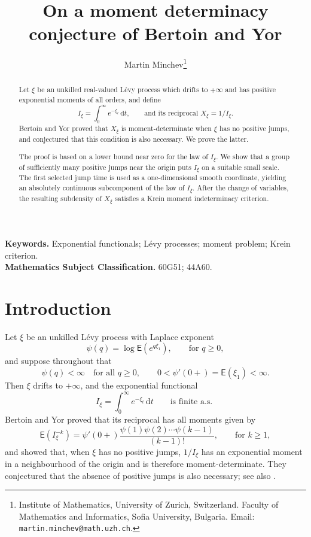 \documentclass[11pt]{article}
\title{On a moment determinacy conjecture of Bertoin and Yor}
\author{
Martin Minchev\thanks{Institute of Mathematics, University of Zurich, Switzerland. Faculty of Mathematics and Informatics, Sofia University, Bulgaria. Email: \texttt{martin.minchev@math.uzh.ch}.}
}
\date{}
\newcommand{\E}{\mathsf E}
\newcommand{\1}{\mathbf 1}
\newcommand{\dd}{\mathrm d}
\begin{document}
\maketitle

\begin{abstract}
Let $\xi$ be an unkilled real-valued L\'evy process which drifts to $+\infty$ and has positive exponential moments of all orders, and define
\[
 I_\xi=\int_0^\infty e^{-\xi_t}\,\dd t,
 \qquad
 \text{and its reciprocal }
 X_\xi=1/I_\xi.
\]
Bertoin and Yor \cite{Bertoin-Yor-2002} proved that $X_\xi$ is moment-determinate when $\xi$ has no positive jumps, and conjectured that this condition is also necessary. We prove the latter.

The proof is based on a lower bound near zero for the law of $I_\xi$. We show that a group of sufficiently many positive jumps near the origin puts $I_\xi$ on a suitable small scale. The first selected jump time is used as a one-dimensional smooth coordinate, yielding an absolutely continuous subcomponent of the law of $I_\xi$. After the change of variables, the resulting subdensity of $X_\xi$ satisfies a Krein moment indeterminacy criterion.
\end{abstract}

\noindent\textbf{Keywords.} Exponential functionals; L\'evy processes; moment problem; Krein criterion.\\
\textbf{Mathematics Subject Classification.} 60G51; 44A60.

\section{Introduction}

Let $\xi$ be an unkilled L\'evy process with Laplace exponent
\[
 \psi(q)=\log \E(e^{q\xi_1}),
 \qquad
 \text{for }q\geq0,
\]
and suppose throughout that
\begin{equation}\label{eq:standing}
 \psi(q)<\infty\quad\text{for all }q\geq0,
 \qquad
 0<\psi'(0+)=\E(\xi_1)<\infty.
\end{equation}
Then $\xi$ drifts to $+\infty$, and the exponential functional
\[
 I_\xi=\int_0^\infty e^{-\xi_t}\,\dd t\qquad
 \text{is finite a.s. }
\]
Bertoin and Yor \cite{Bertoin-Yor-2002} proved that its reciprocal has all moments given by
\begin{equation}\label{eq:BY}
 \E(I_\xi^{-k})=
 \psi'(0+)\frac{\psi(1)\psi(2)\cdots\psi(k-1)}{(k-1)!},
 \qquad
 \text{for }k\geq1,
\end{equation}
and showed that, when $\xi$ has no positive jumps, $1/I_\xi$ has an exponential moment in a neighbourhood of the origin and is therefore moment-determinate. They conjectured that the absence of positive jumps is also necessary; see also \cite{Bertoin-Yor-2005,Minchev-Savov-2026}.
\end{document}
